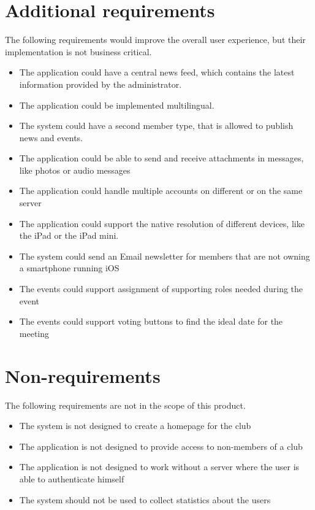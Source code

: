 \section{Additional requirements}
The following requirements would improve the overall user experience, but their implementation is not business critical.
\begin{itemize}
\item The application could have a central news feed, which contains the latest information provided by the administrator.
\item The application could be implemented multilingual. 
\item The system could have a second member type, that is allowed to publish news and events.
\item The application could be able to send and receive attachments in messages, like photos or audio messages
\item The application could handle multiple accounts on different or on the same server
\item The application could support the native resolution of different devices, like the iPad or the iPad mini.
\item The system could send an Email newsletter for members that are not owning a smartphone running iOS
\item The events could support assignment of supporting roles needed during the event 
\item The events could support voting buttons to find the ideal date for the meeting
\end{itemize}

\section{Non-requirements} %
The following requirements are not in the scope of this product.
\begin{itemize}
\item The system is not designed to create a homepage for the club
\item The application is not designed to provide access to non-members of a club
\item The application is not designed to work without a server where the user is able to authenticate himself
\item The system should not be used to collect statistics about the users
\end{itemize}

